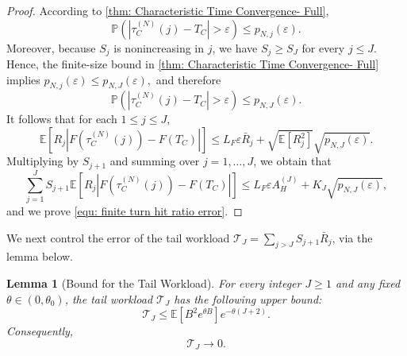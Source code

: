 \documentclass{article}
\newtheorem{lemma}[lemma]{Lemma}
\theoremstyle{definition}
\newcommand{\E}{\mathbb E}
\newcommand{\pro}{\mathbb P}
\begin{document}
\begin{proof}
    According to \cref{thm: Characteristic Time Convergence- Full},
    \begin{equation*}
        \pro\left(\left|\tau_C^{(N)}(j)-T_C\right|>\varepsilon\right)\leq p_{N,j}(\varepsilon).
    \end{equation*}
    Moreover, because $S_j$ is nonincreasing in $j$, we have $S_j\geq S_J$ for every $j\leq J$. Hence, the finite-size bound in \cref{thm: Characteristic Time Convergence- Full} implies $p_{N,j}(\varepsilon)\leq p_{N,J}(\varepsilon),$
    and therefore
    \begin{equation*}
        \pro\left(\left|\tau_C^{(N)}(j)-T_C\right|>\varepsilon\right)\leq p_{N,J}(\varepsilon).
    \end{equation*}
    It follows that for each $1\leq j\leq J$,
    \begin{equation*}
        \E\left[R_j\left|F\left(\tau_C^{(N)}(j)\right)-F(T_C)\right|\right]
        \leq L_F\varepsilon\bar R_j+\sqrt{\E[R_j^2]}\sqrt{p_{N,J}(\varepsilon)}.
    \end{equation*}
    Multiplying by $S_{j+1}$ and summing over $j=1,\ldots,J$, we obtain that
    \begin{equation*}
        \sum_{j=1}^{J}S_{j+1}\E\left[R_j\left|F\left(\tau_C^{(N)}(j)\right)-F(T_C)\right|\right]
        \leq L_F\varepsilon A_H^{(J)}+K_J\sqrt{p_{N,J}(\varepsilon)},
    \end{equation*}
    and we prove \eqref{equ: finite turn hit ratio error}.
\end{proof}


We next control the error of the tail workload $\mathcal T_J = \sum\limits_{j>J}S_{j+1}\bar R_j$, via the lemma below.

\begin{lemma}[Bound for the Tail Workload]
\label{lem: Tail Bound for Reusable Workload}
    For every integer $J\geq1$ and any fixed $\theta\in(0,\theta_0)$, the tail workload $\mathcal T_J$ has the following upper bound:
    \begin{equation}
    \label{equ: reusable workload tail exponential bound}
        \mathcal T_J\leq \E[B^2e^{\theta B}]e^{-\theta(J+2)}.
    \end{equation}
    Consequently,
    \begin{equation}
    \label{equ: reusable workload tail convergence}
        \mathcal T_J\rightarrow 0.
    \end{equation}
\end{lemma}
\end{document}
